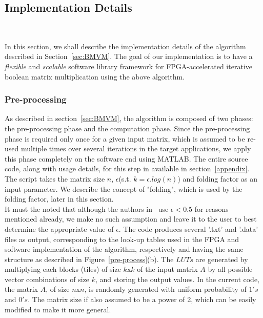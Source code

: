 \documentclass[conference, 9pt]{IEEEtran}
\begin{document}
\subsection{Implementation Details}~\label{sec:Impl}

%
%


In this section, we shall describe the implementation details of the algorithm described in Section~\ref{sec:BMVM}. The goal of our implementation is to have a \emph{flexible} and \emph{scalable} software library framework for FPGA-accelerated iterative boolean matrix multiplication using the above algorithm.\\

\subsubsection{Pre-processing}

As described in section~\ref{sec:BMVM}, the algorithm is composed of two phases: the pre-processing phase and the computation phase. Since the pre-processing phase is required only once for a given input matrix, which is assumed to be re-used multiple times over several iterations in the target applications, we apply this phase completely on the software end using MATLAB. The entire source code, along with usage details, for this step in available in section~\ref{appendix}. The script takes the matrix size $n$, $\epsilon$(s.t. $k = \epsilon .log(n)$) and folding factor as an input parameter. We describe the concept of "folding", which is used by the folding factor, later in this section.\\

It must the noted that although the authors in~\cite{williams2007matrix} use $\epsilon < 0.5$ for reasons mentioned already, we make no such assumption and leave it to the user to best determine the appropriate value of $\epsilon$. The code produces several '.txt' and '.data' files as output, corresponding to the look-up tables used in the FPGA and software implementation of the algorithm, respectively and having the same structure as described in Figure~\ref{pre-process}(b). The $LUTs$ are generated by multiplying each blocks (tiles) of size $k$x$k$ of the input matrix $A$ by all possible vector combinations of size $k$, and storing the output values. In the current code, the matrix $A$, of size $n$x$n$, is randomly generated with uniform probability of $1's$ and $0's$. The matrix size if also assumed to be a power of 2, which can be easily modified to make it more general.\\
\end{document}
